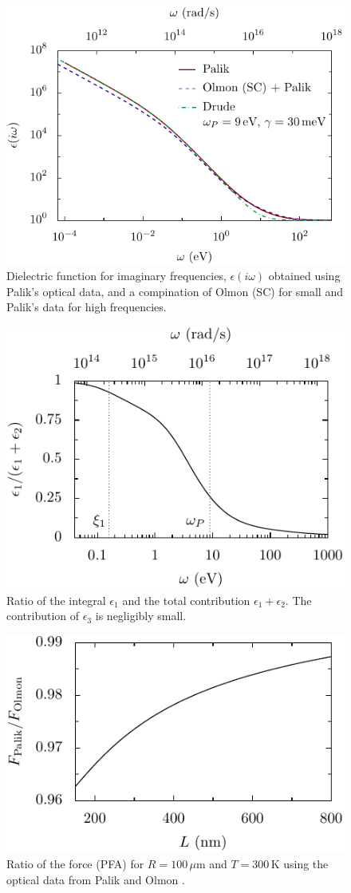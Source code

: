 \documentclass[twocolumn,superscriptaddress,pre]{revtex4-1}
\begin{document}
\begin{figure}
\includegraphics[width=0.95\columnwidth]{img/eps_imag.pdf}
\caption{Dielectric function for imaginary frequencies, $\epsilon(i\omega)$
obtained using Palik's optical data, and a compination of Olmon (SC) for small
and Palik's data for high frequencies.}
\label{fig:eps_imag}
\end{figure}

\begin{figure}
\includegraphics[width=0.7\columnwidth]{img/ratio.pdf}
\caption{Ratio of the integral $\epsilon_1$ and the total contribution
$\epsilon_1+\epsilon_2$. The contribution of $\epsilon_3$ is negligibly small.}
\label{fig:ratio}
\end{figure}

\begin{figure}
\includegraphics[width=0.7\columnwidth]{img/diff.pdf}
\caption{Ratio of the force (PFA) for $R=100\,\mu$m and $T=300\,$K using the optical data from Palik \cite{Palik1995} and Olmon \cite{Olmon2012}.}
\label{fig:diff}
\end{figure}
\end{document}
